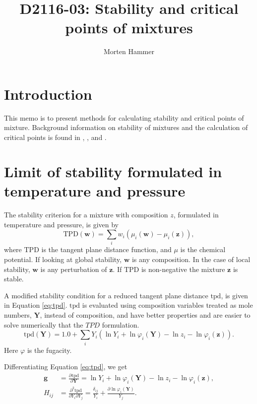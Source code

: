 \documentclass[internal,english]{sintefmemo2012}
\title{D2116-03: Stability and critical points of mixtures}
\author{Morten Hammer}
\newcommand*{\pd}[3][]{\frac{\partial^{#1}#2}{\partial{#3}^{#1}}}%
\newcommand*{\vektor}[1]{\boldsymbol{#1}}%
\newcommand{\tpd}{\ensuremath{\text{tpd}}\xspace}
\newcommand{\TPD}{\ensuremath{\text{TPD}}\xspace}
\begin{document}
\frontmatter
\tableofcontents
\section{Introduction}
This memo is to present methods for calculating stability and critical points of
mixture. Background information on stability of mixtures and the calculation of
critical points is found in \citet{Reid1977}, \citet{Heidemann1980},
\citet{Michelsen1984} and \citet[Chap. 9]{Michelsen2007}.
\section{Limit of stability formulated in temperature and pressure}
\label{sec:tp_fomulation}
The stability criterion for a mixture with composition $z$, formulated
in temperature and pressure, is given by
\begin{equation}
  \label{eq:TPDorg}
  \TPD(\vektor{w}) = \underset{i}{\sum}w_i\left(\mu_i(\vektor{w})-\mu_i(\vektor{z})\right),
\end{equation}
where \TPD is the tangent plane distance function, and $\mu$ is the
chemical potential. If looking at global stability, $\vektor{w}$ is any
composition. In the case of local stability, $\vektor{w}$ is any perturbation
of $\vektor{z}$. If \TPD is non-negative the mixture $\vektor{z}$ is stable.

A modified stability condition for a reduced tangent plane
distance \tpd, is given in Equation \ref{eq:tpd}. \tpd is evaluated
using composition variables treated as mole numbers, $\vektor{Y}$, instead of
composition, and have better properties and are easier to solve
numerically that the $TPD$ formulation.
\begin{equation}
  \tpd(\vektor{Y}) = 1.0 + \underset{i}{\sum}Y_i\left(\ln Y_i + \ln \varphi_i(\vektor{Y})-\ln z_i - \ln \varphi_i(\vektor{z})\right).
  \label{eq:tpd}
\end{equation}
Here $\varphi$ is the fugacity.

Differentiating Equation \ref{eq:tpd}, we get
\begin{align}
  \vektor{g} &= \pd{\tpd}{\vektor{Y}} = \ln Y_i + \ln \varphi_i(\vektor{Y})-\ln z_i - \ln \varphi_i(\vektor{z}),\\
  H_{ij} &= \frac{\partial^2\tpd}{\partial Y_i \partial Y_j} = \frac{\delta_{ij}}{Y_i} + \frac{\partial \ln \varphi_i(\vektor{Y})}{Y_j}.
  \label{eq:dtpd}
\end{align}
\end{document}

